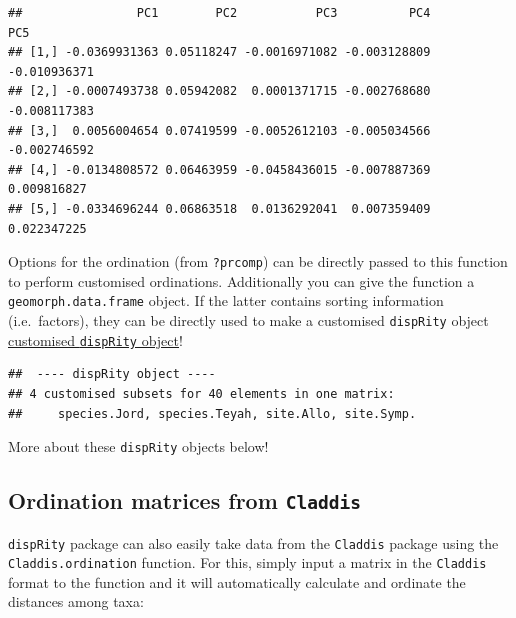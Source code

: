 \documentclass[]{book}
\newenvironment{Shaded}{\begin{snugshade}}{\end{snugshade}}
\newcommand{\CommentTok}[1]{\textcolor[rgb]{0.56,0.35,0.01}{\textit{#1}}}
\newcommand{\DataTypeTok}[1]{\textcolor[rgb]{0.13,0.29,0.53}{#1}}
\newcommand{\KeywordTok}[1]{\textcolor[rgb]{0.13,0.29,0.53}{\textbf{#1}}}
\newcommand{\NormalTok}[1]{#1}
\newcommand{\OperatorTok}[1]{\textcolor[rgb]{0.81,0.36,0.00}{\textbf{#1}}}
\newcommand{\StringTok}[1]{\textcolor[rgb]{0.31,0.60,0.02}{#1}}
\begin{document}
\begin{verbatim}
##                PC1        PC2           PC3          PC4          PC5
## [1,] -0.0369931363 0.05118247 -0.0016971082 -0.003128809 -0.010936371
## [2,] -0.0007493738 0.05942082  0.0001371715 -0.002768680 -0.008117383
## [3,]  0.0056004654 0.07419599 -0.0052612103 -0.005034566 -0.002746592
## [4,] -0.0134808572 0.06463959 -0.0458436015 -0.007887369  0.009816827
## [5,] -0.0334696244 0.06863518  0.0136292041  0.007359409  0.022347225
\end{verbatim}

Options for the ordination (from \texttt{?prcomp}) can be directly passed to this function to perform customised ordinations.
Additionally you can give the function a \texttt{geomorph.data.frame} object.
If the latter contains sorting information (i.e.~factors), they can be directly used to make a customised \texttt{dispRity} object \protect\hyperlink{customised-subsets}{customised \texttt{dispRity} object}!

\begin{Shaded}
\end{Shaded}

\begin{verbatim}
##  ---- dispRity object ---- 
## 4 customised subsets for 40 elements in one matrix:
##     species.Jord, species.Teyah, site.Allo, site.Symp.
\end{verbatim}

More about these \texttt{dispRity} objects below!

\hypertarget{Claddis-ordination}{%
\subsection{\texorpdfstring{Ordination matrices from \texttt{Claddis}}{Ordination matrices from Claddis}}\label{Claddis-ordination}}

\texttt{dispRity} package can also easily take data from the \texttt{Claddis} package using the \texttt{Claddis.ordination} function.
For this, simply input a matrix in the \texttt{Claddis} format to the function and it will automatically calculate and ordinate the distances among taxa:
\end{document}
